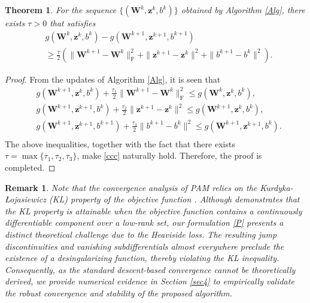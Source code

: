 \documentclass[sn-mathphys]{JORSC-jnl}%
\theoremstyle{thmstyleone}%
\newtheorem{theorem}{Theorem}%
\newtheorem{remark}{Remark}%
\theoremstyle{thmstylethree}%
\theoremstyle{thmstyleone} %
\begin{document}
 \begin{theorem}\label{C2}
	For the sequence $\{(\mathbf{W}^k,\mathbf{z}^k,b^k)\}$ obtained by Algorithm \ref{Alg}, there exists $\tau>0$ that satisfies
\begin{equation}\label{ccc}
    \begin{aligned}
    &g(\mathbf{W}^k,\mathbf{z}^k,b^k)-g(\mathbf{W}^{k+1},\mathbf{z}^{k+1},b^{k+1}) \\
    &\geq \frac{\tau}{2}(\|\mathbf{W}^{k+1}-\mathbf{W}^k\|_{\textrm{F}}^2 + \|\mathbf{z}^{k+1}-\mathbf{z}^k\|^2 + \|b^{k+1}-b^k\|^2).
    \end{aligned}
\end{equation}
\end{theorem}
\begin{proof}
From the updates of Algorithm \ref{Alg}, it is seen that 
\begin{equation*}
    \begin{aligned}
    &g(\mathbf{W}^{k+1},\mathbf{z}^k,b^k)+\frac{\tau_1}{2}\|\mathbf{W}^{k+1}-\mathbf{W}^k\|_{\textrm{F}} ^2\leq g(\mathbf{W}^{k},\mathbf{z}^k,b^k),\\
    &g(\mathbf{W}^{k+1},\mathbf{z}^{k+1},b^k)+\frac{\tau_2}{2}\|\mathbf{z}^{k+1}-\mathbf{z}^k\|^2\leq g(\mathbf{W}^{k+1},\mathbf{z}^k,b^k),\\
    &g(\mathbf{W}^{k+1},\mathbf{z}^{k+1},b^{k+1})+\frac{\tau_3}{2}\|b^{k+1}-b^k\| ^2\leq g(\mathbf{W}^{k+1},\mathbf{z}^{k+1},b^k).\\
    \end{aligned}
\end{equation*}
The above inequalities, together with the fact that there exists $\tau=\max\{\tau_1,\tau_2,\tau_3\}$, make \eqref{ccc}  naturally hold. Therefore, the proof is completed.
\end{proof}

\begin{remark}
Note that the convergence analysis of PAM relies on the Kurdyka-Łojasiewicz (KL) property of the objective function  \cite{bolte2014proximal}. Although \cite{schneider2015convergence2} demonstrates that the KL property is attainable when the objective function contains a continuously differentiable component over a low-rank set, our formulation \eqref{P}  presents a distinct theoretical challenge due to the Heaviside loss. The resulting jump discontinuities and vanishing subdifferentials almost everywhere preclude the existence of a desingularizing function, thereby violating the KL inequality. Consequently, as the standard descent-based convergence cannot be theoretically derived, we provide numerical evidence in Section \ref{sec4} to empirically validate the robust convergence and stability of the proposed algorithm.
\end{remark}
\end{document}
